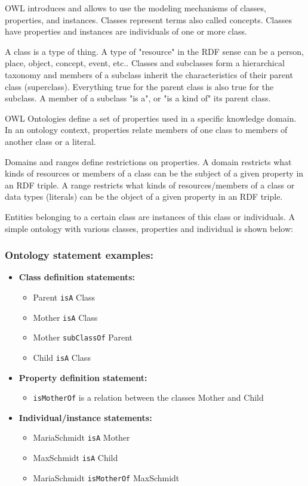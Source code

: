 OWL introduces and allows to use the modeling mechanisms of classes, properties, and instances. Classes represent terms also called concepts. Classes have properties and instances are individuals of one or more class.

A class is a type of thing. A type of "resource" in the RDF sense can be a person, place, object, concept, event, etc.. Classes and subclasses form a hierarchical taxonomy and members of a subclass inherit the characteristics of their parent class (superclass). Everything true for the parent class is also true for the subclass. A member of a subclass "is a", or "is a kind of" its parent class.

OWL Ontologies define a set of properties used in a specific knowledge domain. In an ontology context, properties relate members of one class to members of another class or a literal.

Domains and ranges define restrictions on properties. A domain restricts what kinds of resources or members of a class can be the subject of a given property in an RDF triple. A range restricts what kinds of resources/members of a class or data types (literals) can be the object of a given property in an RDF triple.

Entities belonging to a certain class are instances of this class or individuals. A simple ontology with various classes, properties and individual is shown below:

\subsubsection{Ontology statement examples:}

\begin{itemize}
	\item \textbf {Class definition statements:}
	\begin{itemize}
		\item Parent \texttt{isA} Class
		\item Mother \texttt{isA} Class
		\item Mother \texttt{subClassOf} Parent
		\item Child \texttt{isA} Class
	\end{itemize}
	\item \textbf {Property definition statement:}
	\begin{itemize}
		\item \texttt{isMotherOf} is a relation between the classes Mother and Child
	\end{itemize}
	\item \textbf{Individual/instance statements:}
	\begin{itemize}
		\item MariaSchmidt \texttt{isA} Mother
		\item MaxSchmidt \texttt{isA} Child
		\item MariaSchmidt \texttt{isMotherOf} MaxSchmidt
	\end{itemize}
\end{itemize}


